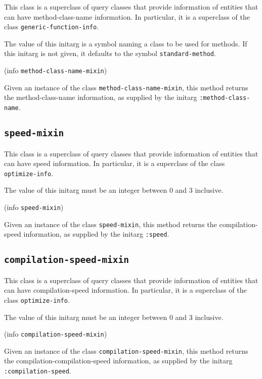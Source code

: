This class is a superclass of query classes that provide information
of entities that can have method-class-name information.  In
particular, it is a superclass of the class
\texttt{generic-function-info}.


The value of this initarg is a symbol naming a class to be used for
methods.  If this initarg is not given, it defaults to the symbol
\texttt{standard-method}.

 {(info {\tt method-class-name-mixin})}

Given an instance of the class \texttt{method-class-name-mixin}, this
method returns the method-class-name information, as supplied by the
initarg \texttt{:method-class-name}.

\subsection{\texttt{speed-mixin}}

This class is a superclass of query classes that provide information
of entities that can have speed information.  In particular, it is a
superclass of the class \texttt{optimize-info}.


The value of this initarg must be an integer between $0$ and $3$
inclusive.

 {(info {\tt speed-mixin})}

Given an instance of the class \texttt{speed-mixin}, this method
returns the compilation-speed information, as supplied by the initarg
\texttt{:speed}.

\subsection{\texttt{compilation-speed-mixin}}

This class is a superclass of query classes that provide information
of entities that can have compilation-speed information.  In particular, it is a
superclass of the class \texttt{optimize-info}.


The value of this initarg must be an integer between $0$ and $3$
inclusive.

 {(info {\tt compilation-speed-mixin})}

Given an instance of the class \texttt{compilation-speed-mixin}, this method
returns the compilation-compilation-speed information, as supplied by the initarg
\texttt{:compilation-speed}.

